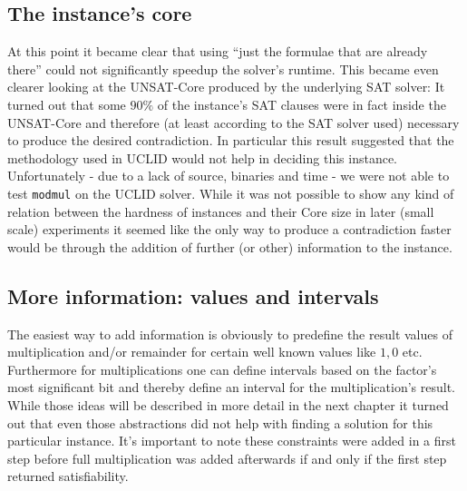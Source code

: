 \subsection{The instance's core}
At this point it became clear that using \enquote{just the formulae that are already there} could not significantly speedup the solver's runtime. This became even clearer looking at the UNSAT-Core produced by the underlying SAT solver: It turned out that some $90\%$ of the instance's SAT clauses were in fact inside the UNSAT-Core and therefore (at least according to the SAT solver used) necessary to produce the desired contradiction.
In particular this result suggested that the methodology used in UCLID \cite{Bryant2007_Chapter_DecidingBit-VectorArithmeticWi-UCLID} would not help in deciding this instance.
Unfortunately - due to a lack of source, binaries and time - we were not able to test \texttt{modmul} on the UCLID solver.
While it was not possible to show any kind of relation between the hardness of instances and their Core size in later (small scale) experiments it seemed like the only way to produce a contradiction faster would be through the addition of further (or other) information to the instance.

\subsection{More information: values and intervals}
The easiest way to add information is obviously to predefine the result values of multiplication and/or remainder for certain well known values like $1,0$ etc. Furthermore for multiplications one can define intervals based on the  factor's most significant bit and thereby define an interval for the multiplication's result. While those ideas will be described in more detail in the next chapter it turned out that even those abstractions did not help with finding a solution for this particular instance. It's important to note these constraints were added in a first step before full multiplication was added afterwards if and only if the first step returned satisfiability.

